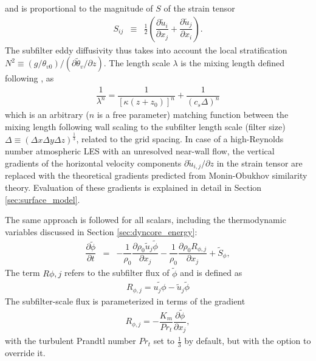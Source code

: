 \documentclass[gmd]{copernicus}
\newcommand{\uf}{\ensuremath{\widetilde{u}}}
\newcommand{\thetaf}{\ensuremath{\widetilde{\theta}}}
\newcommand{\phif}{\ensuremath{\widetilde{\phi}}}
\begin{document}
and is proportional to the magnitude of $S$ of the strain tensor
\begin{eqnarray}
S_{ij} & \equiv & \frac{1}{2} \left( \dfrac{\partial \uf_i}{\partial x_j} + \dfrac{\partial \uf_j}{\partial x_i} \right).
\end{eqnarray}
The subfilter eddy diffusivity thus takes into account the local stratification $N^2 \equiv (g/\theta_{v0})/(\partial \thetaf_v / \partial z)$. The length scale  $\lambda$ is the mixing length defined following \citet{Mason1992}, as
\begin{eqnarray}
\dfrac{1}{\lambda^n} = \dfrac{1}{\left[ \kappa \left(z + z_0 \right) \right]^n} + \dfrac{1}{\left( c_s \Delta \right)^n}
\end{eqnarray}
which is an arbitrary ($n$ is a free parameter) matching function between the mixing length following wall scaling to the subfilter length scale (filter size) $\Delta \equiv (\Delta x \Delta y \Delta z)^\frac{1}{3}$, related to the grid spacing. In case of a high-Reynolds number atmospheric LES with an unresolved near-wall flow, the vertical gradients of the horizontal velocity components $\partial \uf_{i,j}/\partial z$  in the strain tensor are replaced with the theoretical gradients predicted from Monin-Obukhov similarity theory. Evaluation of these gradients is explained in detail in Section \ref{sec:surface_model}.

The same approach is followed for all scalars, including the thermodynamic variables discussed in Section \ref{sec:dyncore_energy}:
\begin{eqnarray}
\dfrac{\partial \phif}{\partial t} & = & - \dfrac{1}{\rho_0} \dfrac{\partial \rho_0 \uf_j \phif}{\partial x_j} - \dfrac{1}{\rho_0} \dfrac{\partial \rho_0 R_{\phi,j}}{\partial x_j} + \widetilde{S}_\phi, \label{eq:consscal_filter}
\end{eqnarray}
The term $R{\phi,j}$ refers to the subfilter flux of $\phif$ and is defined as
\begin{eqnarray}
R_{\phi,j} = \widetilde{u_j \phi} - \uf_j \phif
\end{eqnarray}
The subfilter-scale flux is parameterized in terms of the gradient
\begin{eqnarray}
R_{\phi,j} = - \dfrac{K_m}{Pr_t} \dfrac{\partial \phif}{\partial x_j},
\end{eqnarray}
with the turbulent Prandtl number $Pr_t$ set to $\frac{1}{3}$ by default, but with the option to override it.
\end{document}
